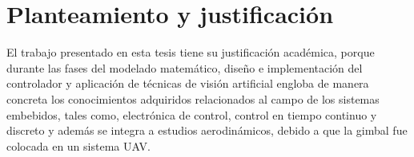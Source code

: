 \section{Planteamiento y justificaci\'on}
El trabajo presentado en esta tesis tiene su justificación académica, porque durante las fases del modelado matemático, diseño e implementación del controlador y aplicación de técnicas de visión artificial engloba de manera concreta los conocimientos adquiridos relacionados al campo de los sistemas embebidos, tales como, electrónica de control, control en tiempo continuo y discreto y además se integra a estudios aerodinámicos, debido a que la gimbal fue colocada en un sistema UAV.







